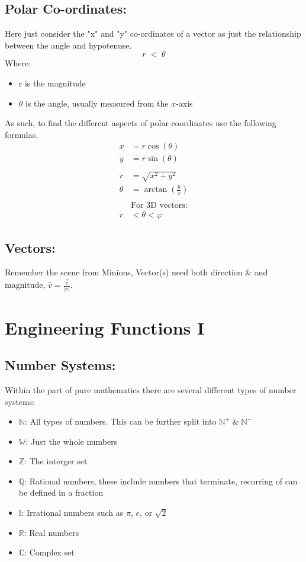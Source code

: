 \documentclass[a5paper]{article}
\begin{document}
	\subsection{Polar Co-ordinates:}
	Here just consider the "x" and "y" co-ordinates of a vector as just the relationship between the angle and hypotenuse.
	$$r\;<\;\theta$$
	Where:
	\begin{itemize}
		\item r is the magnitude
		\item $\theta$ is the angle, usually measured from the $x$-axis
	\end{itemize}
	As such, to find the different aspects of polar co\-ordinates use the following formulas.
	\begin{align*}
		x&=r\cos(\theta)\\
		y&=r\sin(\theta)\\\\
		r&=\sqrt{x^{2}+y^{2}}\\
		\theta&=\arctan(\frac{y}{x})\\\\
		&\text{For 3D vectors:}\\
		r&<\theta<\varphi
	\end{align*}
	
	\subsection{Vectors:}
	Remember the scene from Minions, Vector(s) need both direction \& and magnitude, $\hat{v}=\frac{\vec{v}}{\lvert v\rvert}$.
	
	\pagebreak

	\section{Engineering Functions I}
	\subsection{Number Systems:}
	Within the part of pure mathematics there are several different types of number systems:
	\begin{itemize}
		\item $\mathbb{N}$: All types of numbers. This can be further split into $\mathbb{N}^{+}\;\&\;\mathbb{N}^{-}$
		\item $\mathbb{W}$: Just the whole numbers
		\item $\mathbb{Z}$: The interger set
		\item $\mathbb{Q}$: Rational numbers, these include numbers that terminate, recurring of can be defined in a fraction
		\item $\mathbb{I}$: Irrational numbers such as $\pi$, $e$, or $\sqrt{2}$
		\item $\mathbb{R}$: Real numbers
		\item $\mathbb{C}$: Complex set
	\end{itemize}
\end{document}
